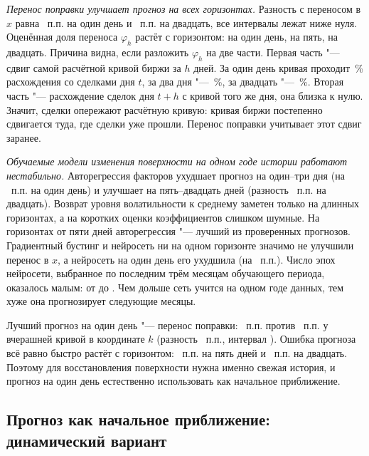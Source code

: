 \documentclass{article}
\begin{document}
\emph{Перенос поправки улучшает прогноз на всех горизонтах.} Разность с переносом в $x$ равна ~п.п. на один день и ~п.п. на двадцать, все интервалы лежат ниже нуля. Оценённая доля переноса $\varphi_h$ растёт с горизонтом:  на один день,  на пять,  на двадцать. Причина видна, если разложить $\varphi_h$ на две части. Первая часть "--- сдвиг самой расчётной кривой биржи за $h$ дней. За один день кривая проходит \,\% расхождения со сделками дня $t$, за два дня "--- \,\%, за двадцать "--- \,\%. Вторая часть "--- расхождение сделок дня $t+h$ с кривой того же дня, она близка к нулю. Значит, сделки опережают расчётную кривую: кривая биржи постепенно сдвигается туда, где сделки уже прошли. Перенос поправки учитывает этот сдвиг заранее.

\emph{Обучаемые модели изменения поверхности на одном годе истории работают нестабильно.} Авторегрессия факторов ухудшает прогноз на один--три дня (на ~п.п. на один день) и улучшает на пять--двадцать дней (разность ~п.п. на двадцать). Возврат уровня волатильности к среднему заметен только на длинных горизонтах, а на коротких оценки коэффициентов слишком шумные. На горизонтах от пяти дней авторегрессия "--- лучший из проверенных прогнозов. Градиентный бустинг и нейросеть ни на одном горизонте значимо не улучшили перенос в $x$, а нейросеть на один день его ухудшила (на ~п.п.). Число эпох нейросети, выбранное по последним трём месяцам обучающего периода, оказалось малым: от  до . Чем дольше сеть учится на одном годе данных, тем хуже она прогнозирует следующие месяцы.

Лучший прогноз на один день "--- перенос поправки: ~п.п. против ~п.п. у вчерашней кривой в координате $k$ (разность ~п.п., интервал ). Ошибка прогноза всё равно быстро растёт с горизонтом: ~п.п. на пять дней и ~п.п. на двадцать. Поэтому для восстановления поверхности нужна именно свежая история, и прогноз на один день естественно использовать как начальное приближение.

\subsection{Прогноз как начальное приближение: динамический вариант}\label{sec:dynexp}
\end{document}
